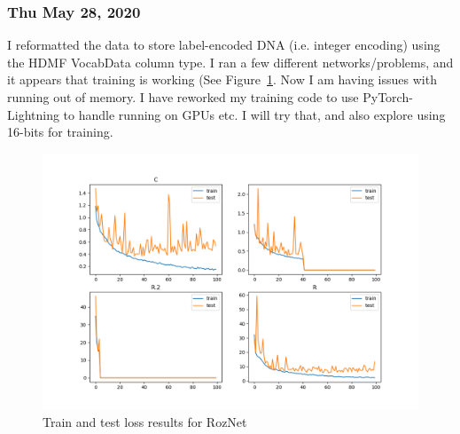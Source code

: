 \documentclass{article}
\begin{document}
\subsubsection*{Thu May 28, 2020}
I reformatted the data to store label-encoded DNA (i.e. integer encoding) using the HDMF VocabData column type. I ran
a few different networks/problems, and it appears that training is working (See Figure~\ref{fig:encoding_fix_results}. Now I am having issues with running out of
memory. I have reworked my training code to use PyTorch-Lightning to handle running on GPUs etc. I will try that, and 
also explore using 16-bits for training. 

\begin{figure}
  \includegraphics[width=\linewidth]{encoding_fix.results.png}
  \caption{Train and test loss results for RozNet}
  \label{fig:encoding_fix_results}
\end{figure}
\end{document}

